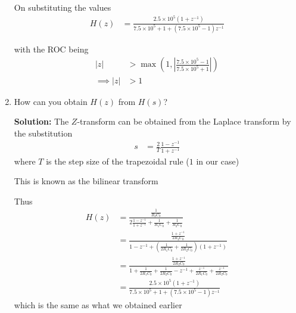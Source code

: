 \documentclass[journal,12pt,twocolumn]{IEEEtran}
\newcommand{\solution}{\noindent \textbf{Solution: }}
\providecommand{\brak}[1]{\ensuremath{\left(#1\right)}}
\providecommand{\abs}[1]{\left\vert#1\right\vert}
\numberwithin{equation}{section}
\numberwithin{figure}{section}
\renewcommand\thesection{\arabic{section}}
\begin{document}
\begin{enumerate}[label=\thesection.\arabic*.,ref=\thesection.\theenumi]
	On substituting the values
	\begin{align}
		H(z) &= \frac{2.5\times10^5 (1+z^{-1})}{7.5\times10^5 + 1 + (7.5\times10^5 - 1)z^{-1}}
	\end{align}
	
	with the ROC being
	\begin{align}
		\abs{z} &> \max\brak{1, \abs{\frac{7.5\times10^5 - 1}{7.5\times10^5 + 1}}} \\
		\implies \abs{z} &> 1
	\end{align}
	
	\item How can you obtain $H(z)$ from $H(s)$?
	
	\solution The $Z$-transform can be obtained from the Laplace transform by the substitution
	\begin{align}
		s &= \frac{2}{T} \frac{1-z^{-1}}{1+z^{-1}}
	\end{align}
	where $T$ is the step size of the trapezoidal rule ($1$ in our case)
	
	This is known as the bilinear transform
	
	Thus
	\begin{align}
		H(z) &= \frac{\frac{1}{R_2C_0}}{2\frac{1-z^{-1}}{1+z^{-1}} + \frac{1}{R_1C_0} + \frac{1}{R_2C_0}} \\
		&= \frac{\frac{1 + z^{-1}}{2R_2C_0}}{1-z^{-1}	 + \brak{\frac{1}{2R_1C_0} + \frac{1}{2R_2C_0}}(1 + z^{-1})} \\
		&= \frac{\frac{1 + z^{-1}}{2R_2C_0}}{1 + \frac{1}{2R_1C_0} + \frac{1}{2R_2C_0} - z^{-1} + \frac{z^{-1}}{2R_1C_0} + \frac{z^{-1}}{2R_2C_0}} \\
		&= \frac{2.5\times10^5 (1+z^{-1})}{7.5\times10^5 + 1 + (7.5\times10^5 - 1)z^{-1}}
	\end{align}
	which is the same as what we obtained earlier
	\end{enumerate}
	
\end{document}
